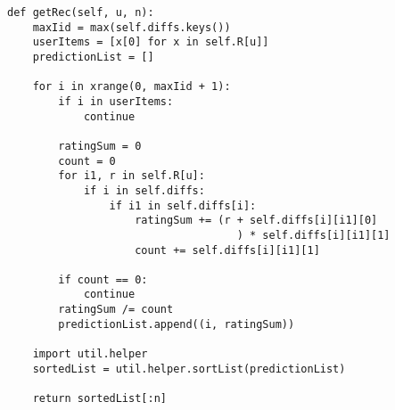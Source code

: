 \begin{lstlisting}[style=python]
def getRec(self, u, n):
    maxIid = max(self.diffs.keys())
    userItems = [x[0] for x in self.R[u]]
    predictionList = []

    for i in xrange(0, maxIid + 1):
        if i in userItems:
            continue

        ratingSum = 0
        count = 0
        for i1, r in self.R[u]:
            if i in self.diffs:
                if i1 in self.diffs[i]:
                    ratingSum += (r + self.diffs[i][i1][0]
                                    ) * self.diffs[i][i1][1]
                    count += self.diffs[i][i1][1]

        if count == 0:
            continue
        ratingSum /= count
        predictionList.append((i, ratingSum))

    import util.helper
    sortedList = util.helper.sortList(predictionList)

    return sortedList[:n]
\end{lstlisting}
